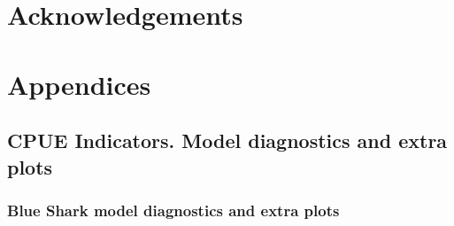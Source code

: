 \documentclass[12pt]{SCreport}
\begin{document}





\section*{Acknowledgements}




\section{Appendices}
% 
\subsection{CPUE Indicators.  Model diagnostics and extra plots}



 \subsubsection*{Blue Shark model diagnostics and extra plots}

  
  
\end{document}
